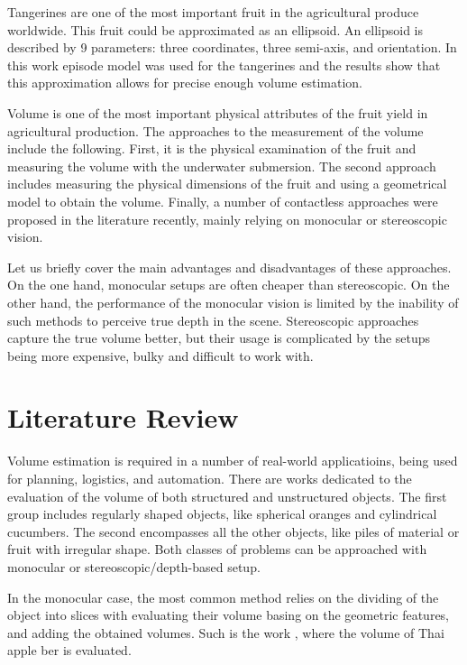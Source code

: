 Tangerines are one of the most important fruit in the agricultural produce worldwide\cite{li2025metafruit}.
This fruit could be approximated as an ellipsoid.
An ellipsoid is described by 9 parameters: three coordinates, three semi-axis, and orientation.
In this work episode model was used for the tangerines and the results show that this approximation allows for precise enough volume estimation.

Volume is one of the most important physical attributes of the fruit yield in agricultural production.
The approaches to the measurement of the volume include the following.
First, it is the physical examination of the fruit and measuring the volume with the underwater submersion.
The second approach includes measuring the physical dimensions of the fruit and using a geometrical model to obtain the volume.
Finally, a number of contactless approaches were proposed in the literature recently, mainly relying on monocular or stereoscopic vision.

Let us briefly cover the main advantages and disadvantages of these approaches.
On the one hand, monocular setups are often cheaper than stereoscopic.
On the other hand, the performance of the monocular vision is limited by the inability of such methods to perceive true depth in the scene.
Stereoscopic approaches capture the true volume better, but their usage is complicated by the setups being more expensive, bulky and difficult to work with.

\section{Literature Review}

Volume estimation is required in a number of real-world applicatioins, being used for planning, logistics, and automation.
There are works dedicated to the evaluation of the volume of both structured and unstructured objects.
The first group includes regularly shaped objects, like spherical oranges and cylindrical cucumbers.
The second encompasses all the other objects, like piles of material or fruit with irregular shape.
Both classes of problems can be approached with monocular or stereoscopic/depth-based setup.

In the monocular case, the most common method relies on the dividing of the object into slices with evaluating their volume basing on the geometric features, and adding the obtained volumes.
Such is the work \cite{mansuri2022computer}, where the volume of Thai apple ber is evaluated.

